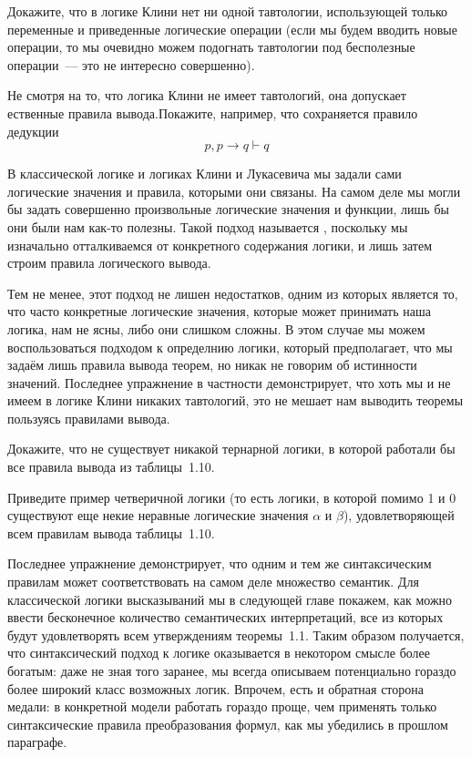 \begin{exercise}
Докажите, что в логике Клини нет ни одной тавтологии, использующей только переменные и приведенные логические операции (если мы будем вводить новые операции, то мы очевидно можем подогнать тавтологии под бесполезные операции~--- это не интересно совершенно).
\end{exercise}

\begin{exercise}
Не смотря на то, что логика Клини не имеет тавтологий, она допускает ественные правила вывода.Покажите, например, что сохраняется правило дедукции
$$p, p\to q\vdash q$$
\end{exercise}

В классической логике и логиках Клини и Лукасевича мы задали сами логические значения и правила, которыми они связаны. На самом деле мы могли бы задать совершенно произвольные логические значения и функции, лишь бы они были нам как-то полезны. Такой подход называется , поскольку мы изначально отталкиваемся от конкретного содержания логики, и лишь затем строим правила логического вывода.

Тем не менее, этот подход не лишен недостатков, одним из которых является то, что часто конкретные логические значения, которые может принимать наша логика, нам не ясны, либо они слишком сложны. В этом случае мы можем воспользоваться  подходом к определнию логики, который предполагает, что мы задаём лишь правила вывода теорем, но никак не говорим об истинности значений. Последнее упражнение в частности демонстрирует, что хоть мы и не имеем в логике Клини никаких тавтологий, это не мешает нам выводить теоремы пользуясь правилами вывода.

\begin{exercise}
Докажите, что не существует никакой тернарной логики, в которой работали бы все правила вывода из таблицы~1.10.
\end{exercise}

\begin{exercise}
Приведите пример четверичной логики (то есть логики, в которой помимо 1 и 0 существуют еще некие неравные логические значения $\alpha$ и $\beta$), удовлетворяющей всем правилам вывода таблицы~1.10.
\end{exercise}

Последнее упражнение демонстрирует, что одним и тем же синтаксическим правилам может соответствовать на самом деле множество семантик. Для классической логики высказываний мы в следующей главе покажем, как можно ввести бесконечное количество семантических интерпретаций, все из которых будут удовлетворять всем утверждениям теоремы~1.1. Таким образом получается, что синтаксический подход к логике оказывается в некотором смысле более богатым: даже не зная того заранее, мы всегда описываем потенциально гораздо более широкий класс возможных логик. Впрочем, есть и обратная сторона медали: в конкретной модели работать гораздо проще, чем применять только синтаксические правила преобразования формул, как мы убедились в прошлом параграфе.

